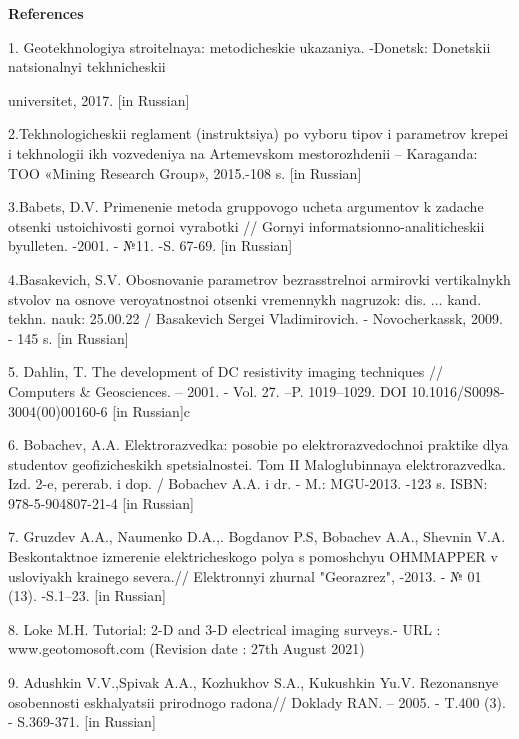 \begin{center}
{\bfseries References}
\end{center}

\begin{noparindent}
1. Geotekhnologiya stroitel\textquotesingle naya: metodicheskie
ukazaniya. -Donetsk: Donetskii natsional\textquotesingle nyi
tekhnicheskii

universitet, 2017. {[}in Russian{]}

2.Tekhnologicheskii reglament (instruktsiya) po vyboru tipov i
parametrov krepei i tekhnologii ikh vozvedeniya na
Artem\textquotesingle evskom mestorozhdenii -- Karaganda: TOO «Mining
Research Group», 2015.-108 s. {[}in Russian{]}

3.Babets, D.V. Primenenie metoda gruppovogo ucheta argumentov k zadache
otsenki ustoichivosti gornoi vyrabotki // Gornyi
informatsionno-analiticheskii byulleten\textquotesingle. -2001. - №11.
-S. 67-69. {[}in Russian{]}

4.Basakevich, S.V. Obosnovanie parametrov
bezrasstrel\textquotesingle noi armirovki vertikal\textquotesingle nykh
stvolov na osnove veroyatnostnoi otsenki vremennykh nagruzok: dis. ...
kand. tekhn. nauk: 25.00.22 / Basakevich Sergei Vladimirovich. -
Novocherkassk, 2009. - 145 s. {[}in Russian{]}

5. Dahlin, T. The development of DC resistivity imaging techniques //
Computers \& Geosciences. -- 2001. - Vol. 27. --P. 1019--1029. DOI
10.1016/S0098-3004(00)00160-6 {[}in Russian{]}c

6. Bobachev, A.A. Elektrorazvedka: posobie po elektrorazvedochnoi
praktike dlya studentov geofizicheskikh spetsial\textquotesingle nostei.
Tom II Maloglubinnaya elektrorazvedka. Izd. 2-e, pererab. i dop. /
Bobachev A.A. i dr. - M.: MGU-2013. -123 s. ISBN: 978-5-904807-21-4
{[}in Russian{]}

7. Gruzdev A.A., Naumenko D.A.,. Bogdanov P.S, Bobachev A.A., Shevnin
V.A. Beskontaktnoe izmerenie elektricheskogo polya s
pomoshch\textquotesingle yu OHMMAPPER v usloviyakh krainego severa.//
Elektronnyi zhurnal "Georazrez", -2013. - № 01 (13). -S.1--23. {[}in
Russian{]}

8. Loke M.H. Tutorial: 2-D and 3-D electrical imaging surveys.- URL :
www.geotomosoft.com (Revision date : 27th August 2021)

9. Adushkin V.V.,Spivak A.A., Kozhukhov S.A., Kukushkin Yu.V.
Rezonansnye osobennosti eskhalyatsii prirodnogo radona// Doklady RAN. --
2005. - T.400 (3). - S.369-371. {[}in Russian{]}
\end{noparindent}

